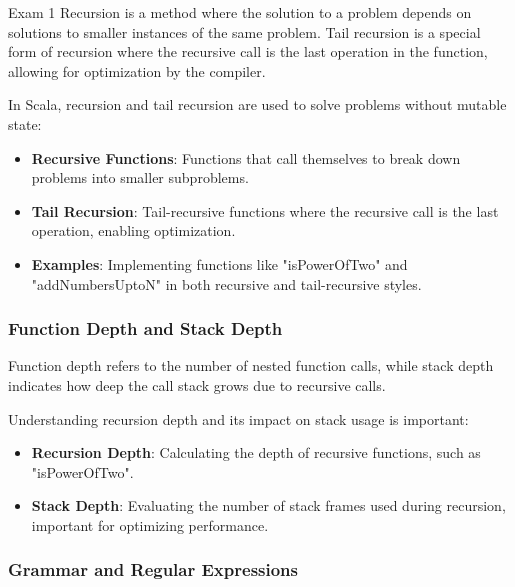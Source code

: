 \begin{examnotes}{Exam 1}
    Recursion is a method where the solution to a problem depends on solutions to smaller instances of the same problem. Tail recursion is a special form of recursion where the recursive call is the 
    last operation in the function, allowing for optimization by the compiler.
    
    \begin{highlight}
        In Scala, recursion and tail recursion are used to solve problems without mutable state:
        \begin{itemize}
            \item \textbf{Recursive Functions}: Functions that call themselves to break down problems into smaller subproblems.
            \item \textbf{Tail Recursion}: Tail-recursive functions where the recursive call is the last operation, enabling optimization.
            \item \textbf{Examples}: Implementing functions like "isPowerOfTwo" and "addNumbersUptoN" in both recursive and tail-recursive styles.
        \end{itemize}
    \end{highlight}
    
    \subsubsection*{Function Depth and Stack Depth}
    
    Function depth refers to the number of nested function calls, while stack depth indicates how deep the call stack grows due to recursive calls.
    
    \begin{highlight}
        Understanding recursion depth and its impact on stack usage is important:
        \begin{itemize}
            \item \textbf{Recursion Depth}: Calculating the depth of recursive functions, such as "isPowerOfTwo".
            \item \textbf{Stack Depth}: Evaluating the number of stack frames used during recursion, important for optimizing performance.
        \end{itemize}
    \end{highlight}
    
    \subsubsection*{Grammar and Regular Expressions}
    

\end{examnotes}
